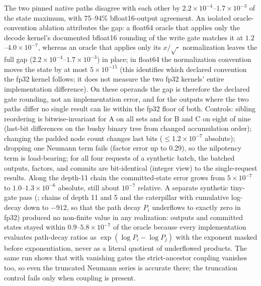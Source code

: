 \documentclass[conference]{IEEEtran}
\begin{document}
The two pinned native paths disagree with each other by $2.2\times10^{-4}$--$1.7\times10^{-3}$ of the state maximum, with 75--94\% bfloat16-output agreement. An isolated oracle-convention ablation attributes the gap: a float64 oracle that applies only the decode kernel's documented bfloat16 rounding of the write gate matches it at $1.2$--$4.0\times10^{-7}$, whereas an oracle that applies only its $x/\sqrt{\cdot}$ normalization leaves the full gap ($2.2\times10^{-4}$--$1.7\times10^{-3}$) in place; in float64 the normalization convention moves the state by at most $5\times10^{-15}$ (this identifies which declared convention the fp32 kernel follows; it does not measure the two fp32 kernels' entire implementation difference). On these operands the gap is therefore the declared gate rounding, not an implementation error, and for the outputs where the two paths differ no single result can lie within the fp32 floor of both. Controls: sibling reordering is bitwise-invariant for A on all sets and for B and C on eight of nine (last-bit differences on the bushy binary tree from changed accumulation order); changing the padded node count changes last bits ($\le1.2\times10^{-7}$ absolute); dropping one Neumann term fails (factor error up to 0.29), so the nilpotency term is load-bearing; for all four requests of a synthetic batch, the batched outputs, factors, and commits are bit-identical (integer view) to the single-request results. Along the depth-11 chain the committed-state error grows from $5\times10^{-7}$ to $1.0$--$1.3\times10^{-6}$ absolute, still about $10^{-7}$ relative. A separate synthetic tiny-gate pass (; chains of depth 11 and 5 and the caterpillar with cumulative log-decay down to $-912$, so that the path decay $P_i$ underflows to exactly zero in fp32) produced no non-finite value in any realization: outputs and committed states stayed within $0.9$--$5.8\times10^{-7}$ of the oracle because every implementation evaluates path-decay ratios as $\exp(\log P_i-\log P_j)$ with the exponent masked before exponentiation, never as a literal quotient of underflowed products. The same run shows that with vanishing gates the strict-ancestor coupling vanishes too, so even the truncated Neumann series is accurate there; the truncation control fails only when coupling is present.
\end{document}

